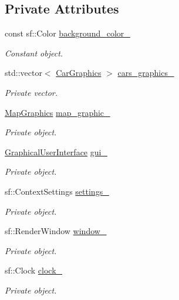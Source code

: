 \subsection*{Private Attributes}
\begin{DoxyCompactItemize}
\item 
const sf\+::\+Color \hyperlink{classGraphics_a44d7a76a58e03b8ad3f025123894c526}{background\+\_\+color\+\_\+}
\begin{DoxyCompactList}\small\item\em Constant object. \end{DoxyCompactList}\item 
std\+::vector$<$ \hyperlink{classCarGraphics}{Car\+Graphics} $>$ \hyperlink{classGraphics_a8be356ffe3ee47f915027361b6ae34ab}{cars\+\_\+graphics\+\_\+}
\begin{DoxyCompactList}\small\item\em Private vector. \end{DoxyCompactList}\item 
\hyperlink{classMapGraphics}{Map\+Graphics} \hyperlink{classGraphics_a7b3e98774ea965783584d5351c730276}{map\+\_\+graphic\+\_\+}
\begin{DoxyCompactList}\small\item\em Private object. \end{DoxyCompactList}\item 
\hyperlink{classGraphicalUserInterface}{Graphical\+User\+Interface} \hyperlink{classGraphics_ac582857f6b0de010eabd0146c4a5f4d2}{gui\+\_\+}
\begin{DoxyCompactList}\small\item\em Private object. \end{DoxyCompactList}\item 
sf\+::\+Context\+Settings \hyperlink{classGraphics_ab8d68b2977c39547e1c10a7669698aca}{settings\+\_\+}
\begin{DoxyCompactList}\small\item\em Private object. \end{DoxyCompactList}\item 
sf\+::\+Render\+Window \hyperlink{classGraphics_ac760fe1abb0b648844c9f15afa087ef6}{window\+\_\+}
\begin{DoxyCompactList}\small\item\em Private object. \end{DoxyCompactList}\item 
sf\+::\+Clock \hyperlink{classGraphics_ad9850d50fe5792666c8aea88f39ba99c}{clock\+\_\+}
\begin{DoxyCompactList}\small\item\em Private object. \end{DoxyCompactList}\item 

\end{DoxyCompactItemize}
